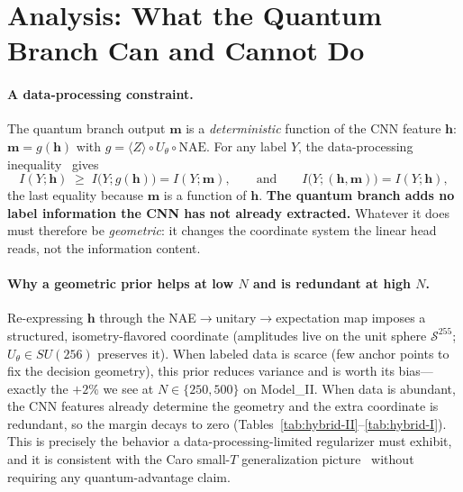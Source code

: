 \documentclass[10pt,letterpaper]{article}
\theoremstyle{plain}
\theoremstyle{definition}
\begin{document}
\section{Analysis: What the Quantum Branch Can and Cannot Do}
\label{sec:analysis}

\paragraph{A data-processing constraint.}
The quantum branch output $\mathbf{m}$ is a \emph{deterministic} function of the
CNN feature $\mathbf{h}$: $\mathbf{m} = g(\mathbf{h})$ with
$g = \langle Z\rangle \circ U_{\theta} \circ \mathrm{NAE}$. For any label $Y$, the
data-processing inequality~\cite{cover2006} gives
\begin{equation}
  I(Y; \mathbf{h}) \;\geq\; I\big(Y; g(\mathbf{h})\big) = I(Y; \mathbf{m}),
  \qquad\text{and}\qquad
  I\big(Y; (\mathbf{h}, \mathbf{m})\big) = I(Y; \mathbf{h}),
\end{equation}
the last equality because $\mathbf{m}$ is a function of $\mathbf{h}$. \textbf{The
quantum branch adds no label information the CNN has not already extracted.}
Whatever it does must therefore be \emph{geometric}: it changes the coordinate
system the linear head reads, not the information content.

\paragraph{Why a geometric prior helps at low $N$ and is redundant at high $N$.}
Re-expressing $\mathbf{h}$ through the NAE$\to$unitary$\to$expectation map imposes
a structured, isometry-flavored coordinate (amplitudes live on the unit sphere
$\mathcal{S}^{255}$; $U_\theta\in SU(256)$ preserves it). When labeled data is
scarce (few anchor points to fix the decision geometry), this prior reduces
variance and is worth its bias---exactly the $+2\%$ we see at $N\in\{250,500\}$ on
Model\_II. When data is abundant, the CNN features already determine the geometry
and the extra coordinate is redundant, so the margin decays to zero
(Tables~\ref{tab:hybrid-II}--\ref{tab:hybrid-I}). This is precisely the behavior a
data-processing-limited regularizer must exhibit, and it is consistent with the
Caro small-$T$ generalization picture~\cite{caro2022} without requiring any
quantum-advantage claim.
\end{document}
